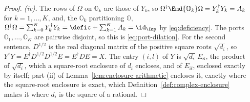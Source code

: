 \begin{proof}
\emph{(iv).} The rows of $\Omega$ on $\mathbb{O}_k$ are those of $Y_k$, so
$\Omega^{\dagger}\Emd{\mathbb{O}_k}\Omega=Y_k^{\dagger}Y_k=A_k$ for
$k=1,\dots,K$, and, the $\mathbb{O}_k$ partitioning $\mathbb{O}$,
$\Omega^{\dagger}\Omega=\sum_{k=0}^{K}Y_k^{\dagger}Y_k
=\defic+\sum_{k=1}^{K}A_k=\id_{\Inp}$ by \eqref{eq:deficiency}. The ports
$\mathbb{O}_1,\dots,\mathbb{O}_K$ are pairwise disjoint, so this is
\eqref{eq:port-dilation}. For the second sentence, $D^{1/2}$ is the real
diagonal matrix of the positive square roots $\sqrt{d_i}$, so
$Y^{\dagger}Y=E^{\dagger}D^{1/2}D^{1/2}E=E^{\dagger}DE=X$. The entry $(i,l)$
of $Y$ is $\sqrt{d_i}\,E_{il}$, the product of $\sqrt{d_i}$, which a
square-root enclosure of $d_i$ encloses, and of $E_{il}$, enclosed exactly
by itself; part (ii) of Lemma~\ref{lem:enclosure-arithmetic} encloses it,
exactly where the square-root enclosure is exact, which
Definition~\ref{def:complex-enclosure} makes it where $d_i$ is the square of
a rational.
\end{proof}
